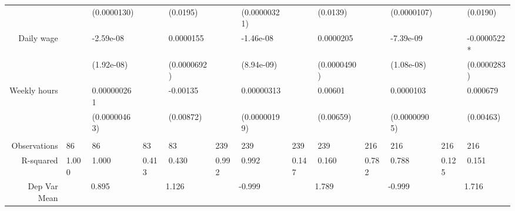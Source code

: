 \begin{tabular}{rrrrrrrrrrrrr}
      & \multicolumn{1}{l}{} & \multicolumn{1}{l}{(0.0000130)} & \multicolumn{1}{l}{} & \multicolumn{1}{l}{(0.0195)} & \multicolumn{1}{l}{} & \multicolumn{1}{l}{(0.00000321)} & \multicolumn{1}{l}{} & \multicolumn{1}{l}{(0.0139)} & \multicolumn{1}{l}{} & \multicolumn{1}{l}{(0.0000107)} & \multicolumn{1}{l}{} & \multicolumn{1}{l}{(0.0190)} \\
Daily wage & \multicolumn{1}{l}{} & \multicolumn{1}{l}{-2.59e-08} & \multicolumn{1}{l}{} & \multicolumn{1}{l}{0.0000155} & \multicolumn{1}{l}{} & \multicolumn{1}{l}{-1.46e-08} & \multicolumn{1}{l}{} & \multicolumn{1}{l}{0.0000205} & \multicolumn{1}{l}{} & \multicolumn{1}{l}{-7.39e-09} & \multicolumn{1}{l}{} & \multicolumn{1}{l}{-0.0000522*} \\
      & \multicolumn{1}{l}{} & \multicolumn{1}{l}{(1.92e-08)} & \multicolumn{1}{l}{} & \multicolumn{1}{l}{(0.0000692)} & \multicolumn{1}{l}{} & \multicolumn{1}{l}{(8.94e-09)} & \multicolumn{1}{l}{} & \multicolumn{1}{l}{(0.0000490)} & \multicolumn{1}{l}{} & \multicolumn{1}{l}{(1.08e-08)} & \multicolumn{1}{l}{} & \multicolumn{1}{l}{(0.0000283)} \\
Weekly hours & \multicolumn{1}{l}{} & \multicolumn{1}{l}{0.000000261} & \multicolumn{1}{l}{} & \multicolumn{1}{l}{-0.00135} & \multicolumn{1}{l}{} & \multicolumn{1}{l}{0.00000313} & \multicolumn{1}{l}{} & \multicolumn{1}{l}{0.00601} & \multicolumn{1}{l}{} & \multicolumn{1}{l}{0.0000103} & \multicolumn{1}{l}{} & \multicolumn{1}{l}{0.000679} \\
      & \multicolumn{1}{l}{} & \multicolumn{1}{l}{(0.00000463)} & \multicolumn{1}{l}{} & \multicolumn{1}{l}{(0.00872)} & \multicolumn{1}{l}{} & \multicolumn{1}{l}{(0.00000199)} & \multicolumn{1}{l}{} & \multicolumn{1}{l}{(0.00659)} & \multicolumn{1}{l}{} & \multicolumn{1}{l}{(0.00000905)} & \multicolumn{1}{l}{} & \multicolumn{1}{l}{(0.00463)} \\
      & \multicolumn{1}{l}{} & \multicolumn{1}{l}{} & \multicolumn{1}{l}{} & \multicolumn{1}{l}{} & \multicolumn{1}{l}{} & \multicolumn{1}{l}{} & \multicolumn{1}{l}{} & \multicolumn{1}{l}{} & \multicolumn{1}{l}{} & \multicolumn{1}{l}{} & \multicolumn{1}{l}{} & \multicolumn{1}{l}{} \\
       \midrule
Observations & \multicolumn{1}{l}{86} & \multicolumn{1}{l}{86} & \multicolumn{1}{l}{83} & \multicolumn{1}{l}{83} & \multicolumn{1}{l}{239} & \multicolumn{1}{l}{239} & \multicolumn{1}{l}{239} & \multicolumn{1}{l}{239} & \multicolumn{1}{l}{216} & \multicolumn{1}{l}{216} & \multicolumn{1}{l}{216} & \multicolumn{1}{l}{216} \\
R-squared & \multicolumn{1}{l}{1.000} & \multicolumn{1}{l}{1.000} & \multicolumn{1}{l}{0.413} & \multicolumn{1}{l}{0.430} & \multicolumn{1}{l}{0.992} & \multicolumn{1}{l}{0.992} & \multicolumn{1}{l}{0.147} & \multicolumn{1}{l}{0.160} & \multicolumn{1}{l}{0.782} & \multicolumn{1}{l}{0.788} & \multicolumn{1}{l}{0.125} & \multicolumn{1}{l}{0.151} \\
Dep Var Mean & \multicolumn{2}{c}{0.895} & \multicolumn{2}{c}{1.126} & \multicolumn{2}{c}{-0.999} & \multicolumn{2}{c}{1.789} & \multicolumn{2}{c}{-0.999} & \multicolumn{2}{c}{1.716} \\
\bottomrule
\end{tabular}%
